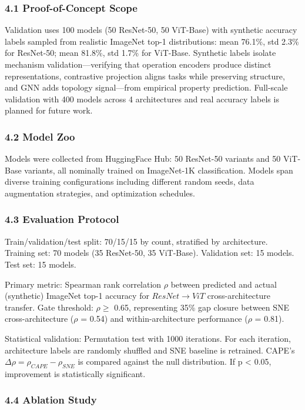 
\subsubsection{4.1 Proof-of-Concept Scope}

Validation uses 100 models (50 ResNet-50, 50 ViT-Base) with synthetic accuracy labels sampled from realistic ImageNet top-1 distributions: mean 76.1\%, std 2.3\% for ResNet-50; mean 81.8\%, std 1.7\% for ViT-Base. Synthetic labels isolate mechanism validation---verifying that operation encoders produce distinct representations, contrastive projection aligns tasks while preserving structure, and GNN adds topology signal---from empirical property prediction. Full-scale validation with 400 models across 4 architectures and real accuracy labels is planned for future work.

\subsubsection{4.2 Model Zoo}

Models were collected from HuggingFace Hub: 50 ResNet-50 variants and 50 ViT-Base variants, all nominally trained on ImageNet-1K classification. Models span diverse training configurations including different random seeds, data augmentation strategies, and optimization schedules.

\subsubsection{4.3 Evaluation Protocol}

Train/validation/test split: 70/15/15 by count, stratified by architecture. Training set: 70 models (35 ResNet-50, 35 ViT-Base). Validation set: 15 models. Test set: 15 models.

Primary metric: Spearman rank correlation $\rho$ between predicted and actual (synthetic) ImageNet top-1 accuracy for $ResNet\rightarrow ViT$ cross-architecture transfer. Gate threshold: $\rho \geq$ 0.65, representing 35\% gap closure between SNE cross-architecture ($\rho$ = 0.54) and within-architecture performance ($\rho$ = 0.81).

Statistical validation: Permutation test with 1000 iterations. For each iteration, architecture labels are randomly shuffled and SNE baseline is retrained. CAPE's $\Delta\rho = \rho_{CAPE} - \rho_{SNE}$ is compared against the null distribution. If p < 0.05, improvement is statistically significant.

\subsubsection{4.4 Ablation Study}

